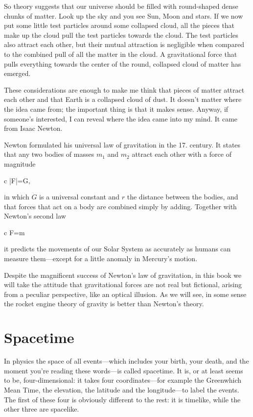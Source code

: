 \documentclass[11pt,oneside%
]{memoir}
\newenvironment{eqna}{\begin{IEEEeqnarray*}{c}}{\end{IEEEeqnarray*}\ignorespacesafterend}
\newcommand{\der}[2]{\frac{\dd#1}{\dd#2}}
\newcommand{\dd}{\mathrm{d}}
\begin{document}
So theory suggests that our universe should be filled with round-shaped dense chunks of matter. Look up the sky and you see Sun, Moon and stars. If we now put some little test particles around some collapsed cloud, all the pieces that make up the cloud pull the test particles towards the cloud. The test particles also attract each other, but their mutual attraction is negligible when compared to the combined pull of all the matter in the cloud. A gravitational force that pulls everything towards the center of the round, collapsed cloud of matter has emerged.

These considerations are enough to make me think that pieces of matter attract each other and that Earth is a collapsed cloud of dust. It doesn't matter where the idea came from; the important thing is that it makes sense. Anyway, if someone's interested, I can reveal where the idea came into my mind. It came from Isaac Newton.

Newton formulated his universal law of gravitation in the 17. century. It states that any two bodies of masses \(m_1\) and \(m_2\) attract each other with a force of magnitude
\begin{eqna}
|F|=G,
\end{eqna}
in which \(G\) is a universal constant and \(r\) the distance between the bodies, and that forces that act on a body are combined simply by adding. Together with Newton's second law
\begin{eqna}
F=m\der{^2x}{t^2}
\end{eqna}
it predicts the movements of our Solar System as accurately as humans can measure them---except for a little anomaly in Mercury's motion.

Despite the magnificent success of Newton's law of gravitation, in this book we will take the attitude that gravitational forces are not real but fictional, arising from a peculiar perspective, like an optical illusion. As we will see, in some sense the rocket engine theory of gravity is better than Newton's theory.

\mainmatter
\chapter{Spacetime}

In physics the space of all events---which includes your birth, your death, and the moment you're reading these words---is called spacetime. It is, or at least seems to be, four-dimensional: it takes four coordinates---for example the Greenwhich Mean Time, the elevation, the latitude and the longitude---to label the events. The first of these four is obviously different to the rest: it is timelike, while the other three are spacelike.
\end{document}
